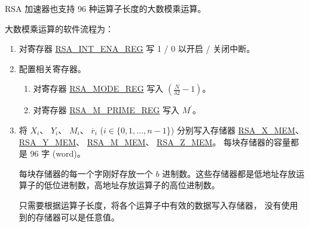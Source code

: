 \documentclass[main\_\_CN.tex]{subfiles}
\begin{document}
RSA 加速器也支持 96 种运算子长度的大数模乘运算。

大数模乘运算的软件流程为：

\begin{enumerate}

    \item 对寄存器 \hyperref[regdesc:RSAINTENAREG]{RSA\_INT\_ENA\_REG} 写 1 / 0 以开启 / 关闭中断。
    
    \item 配置相关寄存器。
    
    \begin{enumerate}
        \item 对寄存器 \hyperref[regdesc:RSAMODEREG]{RSA\_MODE\_REG} 写入 \begin{math}( \frac{N}{32} - 1 )\end{math}。
        
        \item 对寄存器 \hyperref[regdesc:RSAMPRIMEREG]{RSA\_M\_PRIME\_REG} 写入 \begin{math}M^{\prime}\end{math}。
        
    \end{enumerate}

    \item 将
        \begin{math}X_{i}\end{math}、
        \begin{math}Y_{i}\end{math}、
        \begin{math}M_{i}\end{math}、
        \begin{math}\overline{r}_{i}\end{math}
        (\begin{math}i \in \{0, 1, \dots, n-1\end{math}\})
        分别写入存储器 
        \hyperref[regdesc:RSAmemory]{RSA\_X\_MEM}、
        \hyperref[regdesc:RSAmemory]{RSA\_Y\_MEM}、
        \hyperref[regdesc:RSAmemory]{RSA\_M\_MEM}、
        \hyperref[regdesc:RSAmemory]{RSA\_Z\_MEM}。
        每块存储器的容量都是 96 字 (word)。
        
        每块存储器的每一个字刚好存放一个 \begin{math}b\end{math} 进制数。这些存储器都是低地址存放运算子的低位进制数，高地址存放运算子的高位进制数。
        
        只需要根据运算子长度，将各个运算子中有效的数据写入存储器，
        没有使用到的存储器可以是任意值。


\end{enumerate}
\end{document}
